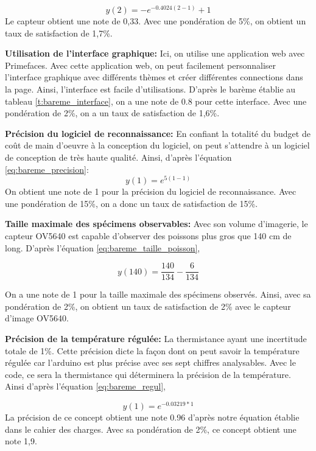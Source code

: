 \begin{equation}
y(2) =
        -e^{-0.4024(2-1)}+1 
\end{equation}
Le capteur obtient une note de 0,33. Avec une pondération de 5\%, on obtient un taux de satisfaction de 1,7\%.

\textbf{Utilisation de l'interface graphique:}
Ici, on utilise une application web avec Primefaces. Avec cette application web, on peut facilement personnaliser l'interface graphique avec différents thèmes et créer différentes connections dans la page. Ainsi, l'interface est facile d'utilisations. D'après le barème établie au tableau \ref{t:bareme_interface}, on a une note de 0.8 pour cette interface. Avec une pondération de 2\%, on a un taux de satisfaction de 1,6\%.

\textbf{Précision du logiciel de reconnaissance:}
En confiant la totalité du budget de coût de main d'oeuvre à la conception du logiciel, on peut s'attendre à un logiciel de conception de très haute qualité. Ainsi, d'après l'équation \ref{eq:bareme_precision}:
\begin{equation}
    y(1) = e^{5(1-1)}
\end{equation}
On obtient une note de 1 pour la précision du logiciel de reconnaissance. Avec une pondération de 15\%, on a donc un taux de satisfaction de 15\%.

\textbf{Taille maximale des spécimens observables:}
Avec son volume d'imagerie, le capteur OV5640 est capable d'observer des poissons plus gros que 140 cm de long. D'après l'équation \ref{eq:bareme_taille_poisson},

\begin{equation}
y(140) =  \frac{140}{134}- \frac{6}{134}
\end{equation}


On a une note de 1 pour la taille maximale des spécimens observés. Ainsi, avec sa pondération de 2\%, on obtient un taux de satisfaction de 2\% avec le capteur d'image OV5640.

\textbf{Précision de la température régulée:}
La thermistance ayant une incertitude totale de 1\%. Cette précision dicte la façon dont on peut savoir la température régulée car l'arduino est plus précise avec ses sept chiffres analysables. Avec le code, ce sera la thermistance qui déterminera la précision de la température. Ainsi d'après l'équation \ref{eq:bareme_regul}, 

\begin{equation}
    y(1) = e^{-0.03219*1}
\end{equation}
La précision de ce concept obtient une note 0.96 d'après notre équation établie dans le cahier des charges. Avec sa pondération de 2\%, ce concept obtient une note 1,9.

